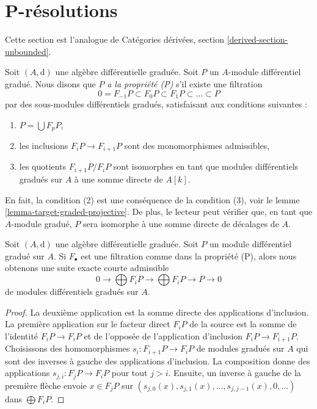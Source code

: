 \section{P-résolutions}
\label{section-P-resolutions}

\noindent
Cette section est l'analogue de
Catégories dérivées, section \ref{derived-section-unbounded}.

\medskip\noindent
Soit $(A, \text{d})$ une algèbre différentielle graduée.
Soit $P$ un $A$-module différentiel gradué. Nous disons
que $P$ {\it a la propriété (P)} s'il existe une filtration
$$
0 = F_{-1}P \subset F_0P \subset F_1P \subset \ldots \subset P
$$
par des sous-modules différentiels gradués, satisfaisant aux conditions suivantes :
\begin{enumerate}
\item $P = \bigcup F_pP$,
\item les inclusions $F_iP \to F_{i + 1}P$ sont des
monomorphismes admissibles,
\item les quotients $F_{i + 1}P/F_iP$ sont isomorphes en tant que modules
différentiels gradués sur $A$ à une somme directe de $A[k]$.
\end{enumerate}
En fait, la condition (2) est une conséquence de la condition (3),
voir le lemme \ref{lemma-target-graded-projective}. De plus, le lecteur
peut vérifier que, en tant que $A$-module gradué, $P$ sera isomorphe à une
somme directe de décalages de $A$.

\begin{lemma}
\label{lemma-property-P-sequence}
Soit $(A, \text{d})$ une algèbre différentielle graduée.
Soit $P$ un module différentiel gradué sur $A$. Si $F_\bullet$ est une
filtration comme dans la propriété (P), alors nous obtenons
une suite exacte courte admissible
$$
0 \to
\bigoplus\nolimits F_iP \to
\bigoplus\nolimits F_iP \to P \to 0
$$
de modules différentiels gradués sur $A$.
\end{lemma}

\begin{proof}
La deuxième application est la somme directe des applications
d'inclusion. La première application sur le facteur direct $F_iP$ de la source
est la somme de l'identité $F_iP \to F_iP$ et de l'opposée de l'application
d'inclusion $F_iP \to F_{i + 1}P$. Choisissons des homomorphismes $s_i : F_{i + 1}P \to F_iP$ de
modules gradués sur $A$ qui sont des inverses à gauche des applications
d'inclusion. La composition donne des applications $s_{j, i} : F_jP \to F_iP$ pour tout
$j > i$. Ensuite, un inverse à gauche de la première flèche envoie $x \in
F_jP$ sur $(s_{j, 0}(x), s_{j, 1}(x), \ldots, s_{j, j - 1}(x), 0, \ldots)$ dans
$\bigoplus F_iP$.
\end{proof}


